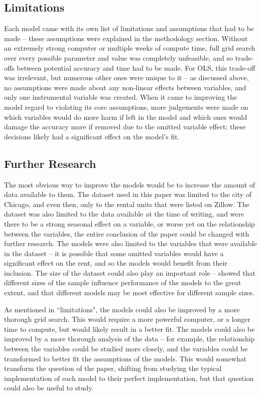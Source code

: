 \documentclass[12pt]{report}
\begin{document}
\subsection{Limitations}
Each model came with its own list of limitations and assumptions that had to be made -- these assumptions were explained in the methodology section. Without an extremely strong computer or multiple weeks of compute time, full grid search over every possible parameter and value was completely unfeasible, and so trade-offs between potential accuracy and time had to be made. For OLS, this trade-off was irrelevant, but numerous other ones were unique to it -- as discussed above, no assumptions were made about any non-linear effects between variables, and only one instrumental variable was created. When it came to improving the model regard to violating its core assumptions, more judgements were made on which variables would do more harm if left in the model and which ones would damage the accuracy more if removed due to the omitted variable effect; these decisions likely had a significant effect on the model's fit.

\subsection{Further Research}
The most obvious way to improve the models would be to increase the amount of data available to them. The dataset used in this paper was limited to the city of Chicago, and even then, only to the rental units that were listed on Zillow. The dataset was also limited to the data available at the time of writing, and were there to be a strong seasonal effect on a variable, or worse yet on the relationship between the variables, the entire conclusion of the paper could be changed with further research. The models were also limited to the variables that were available in the dataset -- it is possible that some omitted variables would have a significant effect on the rent, and so the models would benefit from their inclusion. The size of the dataset could also play an important role -- \cite{yoshida2022} showed that different sizes of the sample influence performance of the models to the great extent, and that different models may be most effective for different sample sizes.

As mentioned in ``limitations", the models could also be improved by a more thorough grid search. This would require a more powerful computer, or a longer time to compute, but would likely result in a better fit. The models could also be improved by a more thorough analysis of the data -- for example, the relationship between the variables could be studied more closely, and the variables could be transformed to better fit the assumptions of the models. This would somewhat transform the question of the paper, shifting from studying the typical implementation of each model to their perfect implementation, but that question could also be useful to study.
\end{document}
